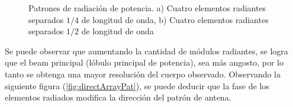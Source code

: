 \begin{figure}[H]
	\centering
	\caption{Patrones de radiación de potencia. a) Cuatro elementos radiantes separados $1/4$ de longitud de onda, b)
	Cuatro elementos radiantes separados $1/2$ de longitud de onda}
	\label{fig:fourArrayPat}
\end{figure}

Se puede observar que aumentando la cantidad de módulos radiantes, se logra que el beam principal (lóbulo principal de 
potencia), sea más angosto, por lo tanto se obtenga una mayor resolución del cuerpo observado. Observando la siguiente 
figura (\ref{fig:directArrayPat}), se puede deducir que la fase de los elementos radiados modifica la dirección del 
patrón de antena.

